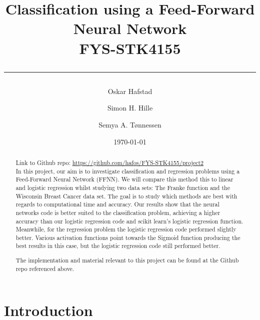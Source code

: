\documentclass[english,notitlepage,reprint,nofootinbib]{revtex4-2}  %
\begin{document}

\title{\vspace*{-2cm}\bf Classification using a Feed-Forward Neural Network \hspace*{5cm}\\
FYS-STK4155\\
\rule{\textwidth}{0.05cm}}
\author[1]{Oskar Hafstad}
\author[3]{Simon H. Hille}
\author[1, 2]{Semya A. Tønnessen}
\date{\today}
\begin{abstract} \centering Link to Github repo: \url{https://github.com/hafos/FYS-STK4155/project2}%
\vspace{3mm}
\\
In this project, our aim is to investigate classification and regression problems using a Feed-Forward Neural Network (FFNN). We will compare this method this to linear and logistic regression whilst studying two data sets: The Franke function and the Wisconsin Breast Cancer data set. 
The goal is to study which methods are best with regards to computational time and accuracy. 
Our results show that the neural networks code is better suited to the classification problem, achieving a higher accuracy than our logistic regression code and scikit learn's logistic regression function. Meanwhile, for the regression problem the logistic regression code performed slightly better. Various activation functions point towards the Sigmoid function producing the best results in this case, but the logistic regression code still performed better. 

The implementation and material relevant to this project can be found at the Github repo referenced above. 
\end{abstract}
\maketitle

\section{Introduction} 
\end{document}
